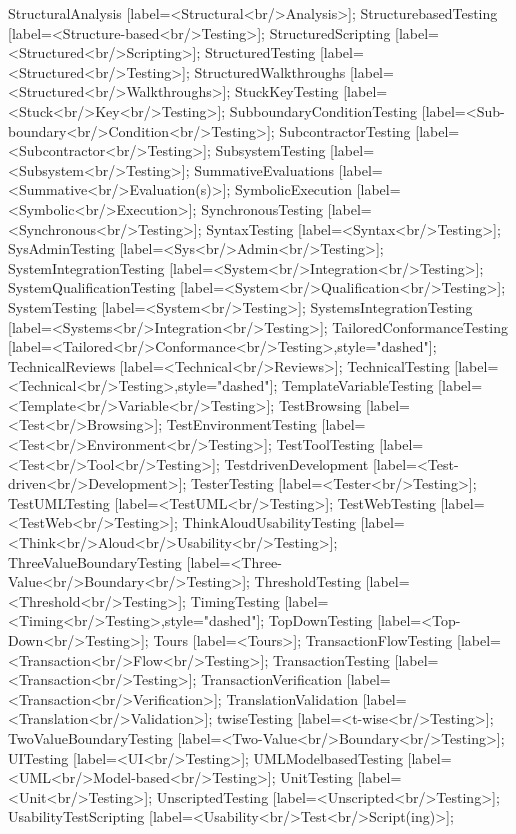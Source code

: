 \documentclass{article}
\begin{document}
{StructuralAnalysis [label=<Structural<br/>Analysis>];
StructurebasedTesting [label=<Structure-based<br/>Testing>];
StructuredScripting [label=<Structured<br/>Scripting>];
StructuredTesting [label=<Structured<br/>Testing>];
StructuredWalkthroughs [label=<Structured<br/>Walkthroughs>];
StuckKeyTesting [label=<Stuck<br/>Key<br/>Testing>];
SubboundaryConditionTesting [label=<Sub-boundary<br/>Condition<br/>Testing>];
SubcontractorTesting [label=<Subcontractor<br/>Testing>];
SubsystemTesting [label=<Subsystem<br/>Testing>];
SummativeEvaluations [label=<Summative<br/>Evaluation(s)>];
SymbolicExecution [label=<Symbolic<br/>Execution>];
SynchronousTesting [label=<Synchronous<br/>Testing>];
SyntaxTesting [label=<Syntax<br/>Testing>];
SysAdminTesting [label=<Sys<br/>Admin<br/>Testing>];
SystemIntegrationTesting [label=<System<br/>Integration<br/>Testing>];
SystemQualificationTesting [label=<System<br/>Qualification<br/>Testing>];
SystemTesting [label=<System<br/>Testing>];
SystemsIntegrationTesting [label=<Systems<br/>Integration<br/>Testing>];
TailoredConformanceTesting [label=<Tailored<br/>Conformance<br/>Testing>,style="dashed"];
TechnicalReviews [label=<Technical<br/>Reviews>];
TechnicalTesting [label=<Technical<br/>Testing>,style="dashed"];
TemplateVariableTesting [label=<Template<br/>Variable<br/>Testing>];
TestBrowsing [label=<Test<br/>Browsing>];
TestEnvironmentTesting [label=<Test<br/>Environment<br/>Testing>];
TestToolTesting [label=<Test<br/>Tool<br/>Testing>];
TestdrivenDevelopment [label=<Test-driven<br/>Development>];
TesterTesting [label=<Tester<br/>Testing>];
TestUMLTesting [label=<TestUML<br/>Testing>];
TestWebTesting [label=<TestWeb<br/>Testing>];
ThinkAloudUsabilityTesting [label=<Think<br/>Aloud<br/>Usability<br/>Testing>];
ThreeValueBoundaryTesting [label=<Three-Value<br/>Boundary<br/>Testing>];
ThresholdTesting [label=<Threshold<br/>Testing>];
TimingTesting [label=<Timing<br/>Testing>,style="dashed"];
TopDownTesting [label=<Top-Down<br/>Testing>];
Tours [label=<Tours>];
TransactionFlowTesting [label=<Transaction<br/>Flow<br/>Testing>];
TransactionTesting [label=<Transaction<br/>Testing>];
TransactionVerification [label=<Transaction<br/>Verification>];
TranslationValidation [label=<Translation<br/>Validation>];
twiseTesting [label=<t-wise<br/>Testing>];
TwoValueBoundaryTesting [label=<Two-Value<br/>Boundary<br/>Testing>];
UITesting [label=<UI<br/>Testing>];
UMLModelbasedTesting [label=<UML<br/>Model-based<br/>Testing>];
UnitTesting [label=<Unit<br/>Testing>];
UnscriptedTesting [label=<Unscripted<br/>Testing>];
UsabilityTestScripting [label=<Usability<br/>Test<br/>Script(ing)>];
}
\end{document}
